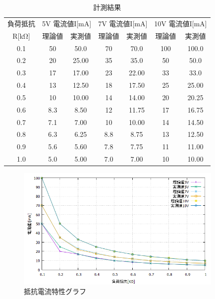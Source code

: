 \documentclass[titlepage]{jarticle}
\begin{document}
\begin{table}[H]
    \centering
    \label{tab:tab`le1}
    \caption{計測結果}
    \begin{tabular}{c|c|c|c|c|c|c|c} \hline \hline
        \multicolumn{2}{c|}{負荷抵抗} & \multicolumn{2}{c|}{5V 電流値I[mA]} 
        & \multicolumn{2}{c|}{7V 電流値I[mA]} & \multicolumn{2}{c}{10V 電流値I[mA]}\\\cline{3-8}
        \multicolumn{2}{c|}{R[kΩ]} & 理論値 & 実測値 & 理論値 & 実測値 & 理論値 & 実測値\\
    \hline
        \multicolumn{2}{c|}{0.1} & 50 & 50.0 & 70 & 70.0 & 100 & 100.0 \\\hline
        \multicolumn{2}{c|}{0.2} & 20 & 25.00 & 35 & 35.0 & 50 & 50.0 \\\hline
        \multicolumn{2}{c|}{0.3} & 17 & 17.00 & 23 & 22.00 & 33 & 33.0 \\ \hline
        \multicolumn{2}{c|}{0.4} & 13 & 12.50 & 18 & 17.50 & 25 & 25.00 \\ \hline
        \multicolumn{2}{c|}{0.5} & 10 & 10.00 & 14 & 14.00 & 20 & 20.25 \\ \hline
        \multicolumn{2}{c|}{0.6} & 8.3 & 8.50 & 12 & 11.75 & 17 & 16.75 \\ \hline
        \multicolumn{2}{c|}{0.7} & 7.1 & 7.00 & 10 & 10.00 & 14 & 14.50 \\ \hline
        \multicolumn{2}{c|}{0.8} & 6.3 & 6.25 & 8.8 & 8.75 & 13 & 12.50 \\ \hline
        \multicolumn{2}{c|}{0.9} & 5.6 & 5.60 & 7.8 & 7.75 & 11 & 11.00 \\ \hline
        \multicolumn{2}{c|}{1.0} & 5.0 & 5.00 & 7.0 & 7.00 & 10 & 10.00 \\ \hline
      \end{tabular}
\end{table}

\begin{figure}[H]
    \begin{center}
        \includegraphics[width=10cm]{01.png}
        \caption{抵抗電流特性グラフ}
    \end{center}
\end{figure}
\end{document}
